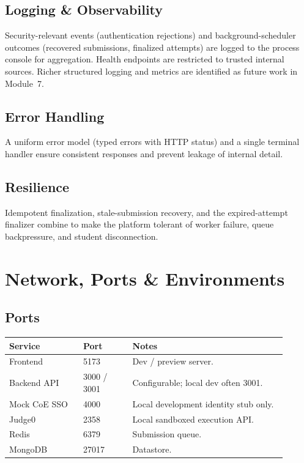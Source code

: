 \documentclass[12pt,a4paper,oneside]{report}
\begin{document}
\section{Logging \& Observability}
Security-relevant events (authentication rejections) and background-scheduler
outcomes (recovered submissions, finalized attempts) are logged to the process
console for aggregation. Health endpoints are restricted to trusted internal
sources. Richer structured logging and metrics are identified as future work in
Module~7.

\section{Error Handling}
A uniform error model (typed errors with HTTP status) and a single terminal
handler ensure consistent responses and prevent leakage of internal detail.

\section{Resilience}
Idempotent finalization, stale-submission recovery, and the expired-attempt
finalizer combine to make the platform tolerant of worker failure, queue
backpressure, and student disconnection.

\chapter{Network, Ports \& Environments}
\section{Ports}
\begin{longtable}{@{}p{0.24\linewidth} p{0.16\linewidth} p{0.50\linewidth}@{}}
\toprule
\textbf{Service} & \textbf{Port} & \textbf{Notes}\\
\midrule
\endhead
Frontend & 5173 & Dev / preview server.\\
Backend API & 3000 / 3001 & Configurable; local dev often 3001.\\
Mock CoE SSO & 4000 & Local development identity stub only.\\
Judge0 & 2358 & Local sandboxed execution API.\\
Redis & 6379 & Submission queue.\\
MongoDB & 27017 & Datastore.\\
\bottomrule
\end{longtable}
\end{document}
